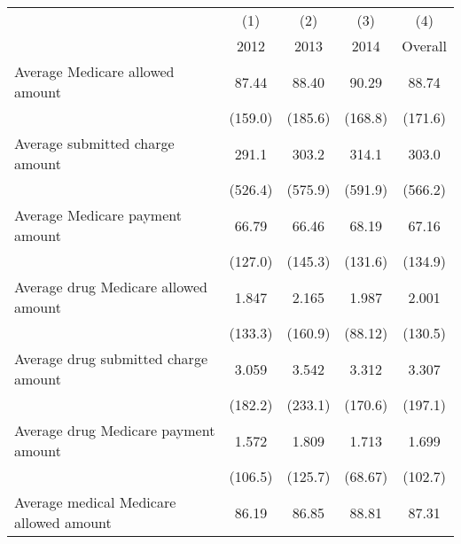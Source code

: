 \def\sym#1{\ifmmode^{#1}\else\(^{#1}\)\fi}
\begin{adjustbox}{max
width={\textwidth},caption={Summary Statistics, Aggregate Table\label{table:aggregatesum}},nofloat=table}
\begin{tabular}{l*{4}{c}}
\toprule
                    &\multicolumn{1}{c}{(1)}&\multicolumn{1}{c}{(2)}&\multicolumn{1}{c}{(3)}&\multicolumn{1}{c}{(4)}\\
                    &\multicolumn{1}{c}{2012}&\multicolumn{1}{c}{2013}&\multicolumn{1}{c}{2014}&\multicolumn{1}{c}{Overall}\\
\midrule
Average Medicare allowed amount&       87.44         &       88.40         &       90.29         &       88.74         \\
                    &     (159.0)         &     (185.6)         &     (168.8)         &     (171.6)         \\
\addlinespace
Average submitted charge amount&       291.1         &       303.2         &       314.1         &       303.0         \\
                    &     (526.4)         &     (575.9)         &     (591.9)         &     (566.2)         \\
\addlinespace
Average Medicare payment amount&       66.79         &       66.46         &       68.19         &       67.16         \\
                    &     (127.0)         &     (145.3)         &     (131.6)         &     (134.9)         \\
\addlinespace
Average drug Medicare allowed amount&       1.847         &       2.165         &       1.987         &       2.001         \\
                    &     (133.3)         &     (160.9)         &     (88.12)         &     (130.5)         \\
\addlinespace
Average drug submitted charge amount&       3.059         &       3.542         &       3.312         &       3.307         \\
                    &     (182.2)         &     (233.1)         &     (170.6)         &     (197.1)         \\
\addlinespace
Average drug Medicare payment amount&       1.572         &       1.809         &       1.713         &       1.699         \\
                    &     (106.5)         &     (125.7)         &     (68.67)         &     (102.7)         \\
\addlinespace
Average medical Medicare allowed amount&       86.19         &       86.85         &       88.81         &       87.31         \\

\end{tabular}
\end{adjustbox}
